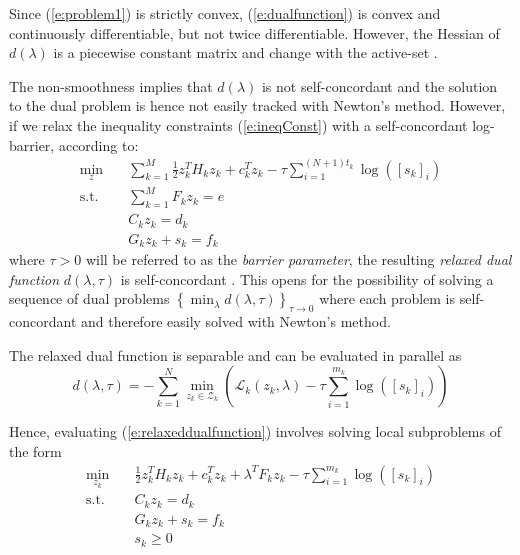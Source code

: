 Since (\ref{e:problem1}) is strictly convex, (\ref{e:dualfunction}) is convex and continuously differentiable, but not twice differentiable. However, the Hessian of $d(\lambda)$ is a piecewise constant matrix and change with the active-set \cite{Kozma2014a}.

The non-smoothness implies that $d(\lambda)$ is not self-concordant and the solution to the dual problem is hence not easily tracked with Newton's method. However, if we relax the inequality constraints (\ref{e:ineqConst}) with a self-concordant log-barrier, according to:
\begin{subequations}
\label{e:relaxedproblem}
\begin{align}
\min_z & \quad \sum_{k=1}^{M} \frac{1}{2}z_k^TH_k z_k + c_k^T z_k - \tau \sum_{i=1}^{(N+1)t_k} \log([s_k]_i) \label{e:1} \\
\text{s.t.} & \quad \sum_{k=1}^{M} F_k z_k = e \\
& \quad C_k z_k = d_k \\
& \quad G_k z_k + s_k = f_k
\end{align}
\end{subequations}
where $\tau > 0$ will be referred to as the \emph{barrier parameter}, the resulting \emph{relaxed dual function} $d(\lambda, \tau)$ is self-concordant \cite{Necoara2009a}. This opens for the possibility of solving a sequence of dual problems $\left\{\min_\lambda d(\lambda, \tau) \right\}_{\tau \rightarrow 0}$ where each problem is self-concordant and therefore easily solved with Newton's method.

The relaxed dual function is separable and can be evaluated in parallel as
\begin{equation}
\label{e:relaxeddualfunction}
d(\lambda, \tau) = -\sum_{k=1}^N \min_{z_k \in \mathcal{Z}_k} \left( \mathcal{L}_k(z_k, \lambda) - \tau \sum_{i=1}^{m_k} \log([s_k]_i) \right)
\end{equation}

Hence, evaluating (\ref{e:relaxeddualfunction}) involves solving local subproblems of the form
\begin{equation}
\label{e:localproblem}
\begin{aligned}
\min_{z_k} & \quad \frac{1}{2}z_k^T H_k z_k + c_k^T z_k + \lambda^TF_k z_k - \tau \sum_{i=1}^{m_k} \log([s_k]_i) \\
\text{s.t.} & \quad C_k z_k = d_k \\ 
& \quad G_k z_k + s_k = f_k \\
& \quad s_k \geq 0
\end{aligned}
\end{equation}


